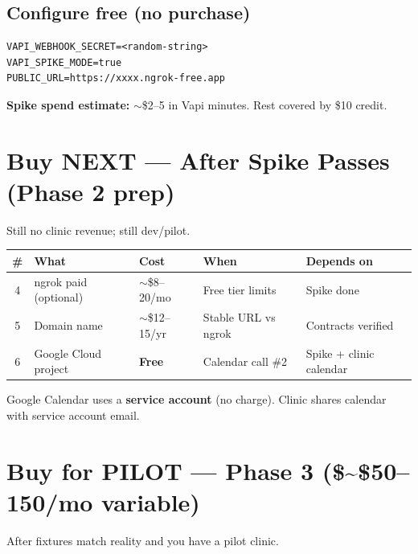 \documentclass[11pt,a4paper]{article}
\begin{document}
\subsection{Configure free (no purchase)}

\begin{verbatim}
VAPI_WEBHOOK_SECRET=<random-string>
VAPI_SPIKE_MODE=true
PUBLIC_URL=https://xxxx.ngrok-free.app
\end{verbatim}

\textbf{Spike spend estimate:} $\sim$\$2--5 in Vapi minutes. Rest covered by \$10 credit.

\section{Buy NEXT --- After Spike Passes (Phase 2 prep)}

Still no clinic revenue; still dev/pilot.

\begin{center}
\small
\begin{tabular}{@{}cllll@{}}
\toprule
\textbf{\#} & \textbf{What} & \textbf{Cost} & \textbf{When} & \textbf{Depends on} \\
\midrule
4 & ngrok paid (optional) & $\sim$\$8--20/mo & Free tier limits & Spike done \\
5 & Domain name & $\sim$\$12--15/yr & Stable URL vs ngrok & Contracts verified \\
6 & Google Cloud project & \textbf{Free} & Calendar call \#2 & Spike + clinic calendar \\
\bottomrule
\end{tabular}
\end{center}

Google Calendar uses a \textbf{service account} (no charge). Clinic shares calendar with service account email.

\section{Buy for PILOT --- Phase 3 (\$\sim\$50--150/mo variable)}

After fixtures match reality and you have a pilot clinic.
\end{document}
